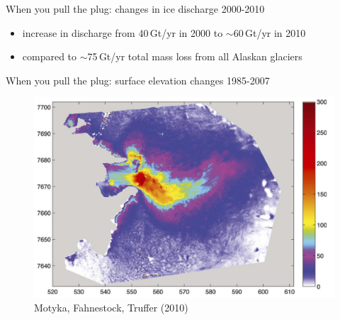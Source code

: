 \documentclass[hide notes,intlimits]{beamer}
\begin{document}
  {
}


\begin{frame}{When you pull the plug: changes in ice discharge 2000-2010}
  \begin{itemize}
  \item increase in discharge from 40\,Gt/yr in 2000 to $\sim$60\,Gt/yr in 2010
  \item compared to $\sim$75\,Gt/yr total mass loss from all Alaskan glaciers
  \end{itemize}
\end{frame}


{
%
} 

\begin{frame}{When you pull the plug: surface elevation changes 1985-2007}

  \begin{figure}
    \includegraphics[width=.8\textwidth]{jib-obs-surface-diff-motyka} \\
    \footnotesize{Motyka, Fahnestock, Truffer (2010)}
  \end{figure}
\end{frame}
\end{document}
